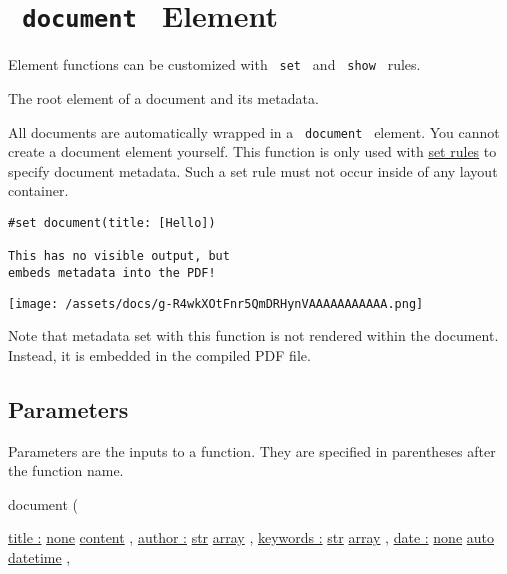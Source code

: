 \section{\texorpdfstring{\texttt{\ document\ } {{ Element
}}}{ document   Element }}\label{summary}

\label{element-tooltip}
Element functions can be customized with \texttt{\ set\ } and
\texttt{\ show\ } rules.

The root element of a document and its metadata.

All documents are automatically wrapped in a \texttt{\ document\ }
element. You cannot create a document element yourself. This function is
only used with \href{/docs/reference/styling/\#set-rules}{set rules} to
specify document metadata. Such a set rule must not occur inside of any
layout container.

\begin{verbatim}
#set document(title: [Hello])

This has no visible output, but
embeds metadata into the PDF!
\end{verbatim}

\texttt{[image: /assets/docs/g-R4wkXOtFnr5QmDRHynVAAAAAAAAAAA.png]}

Note that metadata set with this function is not rendered within the
document. Instead, it is embedded in the compiled PDF file.

\subsection{\texorpdfstring{{ Parameters
}}{ Parameters }}\label{parameters}

\label{parameters-tooltip}
Parameters are the inputs to a function. They are specified in
parentheses after the function name.

{ document } (

{ \hyperref[parameters-title]{title :}
\href{/docs/reference/foundations/none/}{none}
\href{/docs/reference/foundations/content/}{content} , } {
\hyperref[parameters-author]{author :}
\href{/docs/reference/foundations/str/}{str}
\href{/docs/reference/foundations/array/}{array} , } {
\hyperref[parameters-keywords]{keywords :}
\href{/docs/reference/foundations/str/}{str}
\href{/docs/reference/foundations/array/}{array} , } {
\hyperref[parameters-date]{date :}
\href{/docs/reference/foundations/none/}{none}
\href{/docs/reference/foundations/auto/}{auto}
\href{/docs/reference/foundations/datetime/}{datetime} , }

